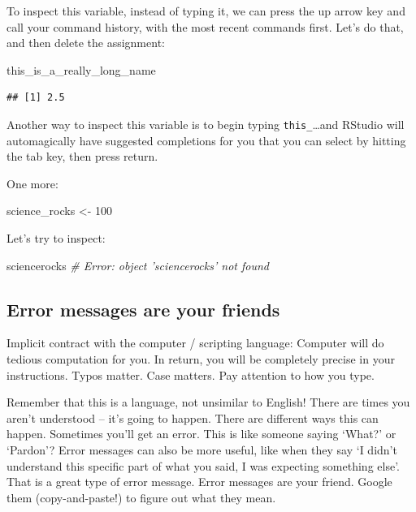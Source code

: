 \documentclass[]{book}
\newenvironment{Shaded}{\begin{snugshade}}{\end{snugshade}}
\newcommand{\DecValTok}[1]{\textcolor[rgb]{0.00,0.00,0.81}{#1}}
\newcommand{\StringTok}[1]{\textcolor[rgb]{0.31,0.60,0.02}{#1}}
\newcommand{\CommentTok}[1]{\textcolor[rgb]{0.56,0.35,0.01}{\textit{#1}}}
\newcommand{\NormalTok}[1]{#1}
\theoremstyle{definition}
\theoremstyle{definition}
\theoremstyle{definition}
\theoremstyle{remark}
\begin{document}
To inspect this variable, instead of typing it, we can press the up
arrow key and call your command history, with the most recent commands
first. Let's do that, and then delete the assignment:

\begin{Shaded}
\begin{Highlighting}[]
\NormalTok{this_is_a_really_long_name}
\end{Highlighting}
\end{Shaded}

\begin{verbatim}
## [1] 2.5
\end{verbatim}

Another way to inspect this variable is to begin typing
\texttt{this\_}\ldots{}and RStudio will automagically have suggested
completions for you that you can select by hitting the tab key, then
press return.

One more:

\begin{Shaded}
\begin{Highlighting}[]
\NormalTok{science_rocks <-}\StringTok{ }\DecValTok{100}
\end{Highlighting}
\end{Shaded}

Let's try to inspect:

\begin{Shaded}
\begin{Highlighting}[]
\NormalTok{sciencerocks}
\CommentTok{# Error: object 'sciencerocks' not found}
\end{Highlighting}
\end{Shaded}

\subsection{Error messages are your
friends}\label{error-messages-are-your-friends}

Implicit contract with the computer / scripting language: Computer will
do tedious computation for you. In return, you will be completely
precise in your instructions. Typos matter. Case matters. Pay attention
to how you type.

Remember that this is a language, not unsimilar to English! There are
times you aren't understood -- it's going to happen. There are different
ways this can happen. Sometimes you'll get an error. This is like
someone saying `What?' or `Pardon'? Error messages can also be more
useful, like when they say `I didn't understand this specific part of
what you said, I was expecting something else'. That is a great type of
error message. Error messages are your friend. Google them
(copy-and-paste!) to figure out what they mean.
\end{document}

